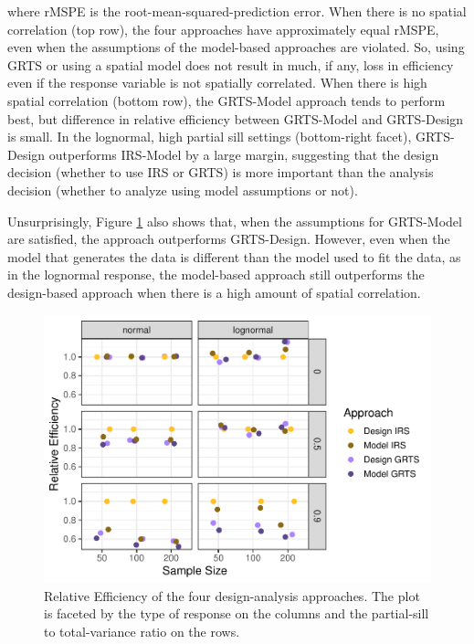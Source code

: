 \documentclass[]{elsarticle} %
\begin{document}
where rMSPE is the root-mean-squared-prediction error. When there is no
spatial correlation (top row), the four approaches have approximately
equal rMSPE, even when the assumptions of the model-based approaches are
violated. So, using GRTS or using a spatial model does not result in
much, if any, loss in efficiency even if the response variable is not
spatially correlated. When there is high spatial correlation (bottom
row), the GRTS-Model approach tends to perform best, but difference in
relative efficiency between GRTS-Model and GRTS-Design is small. In the
lognormal, high partial sill settings (bottom-right facet), GRTS-Design
outperforms IRS-Model by a large margin, suggesting that the design
decision (whether to use IRS or GRTS) is more important than the
analysis decision (whether to analyze using model assumptions or not).

Unsurprisingly, Figure \ref{fig:figeff} also shows that, when the
assumptions for GRTS-Model are satisfied, the approach outperforms
GRTS-Design. However, even when the model that generates the data is
different than the model used to fit the data, as in the lognormal
response, the model-based approach still outperforms the design-based
approach when there is a high amount of spatial correlation.

\begin{figure}
\includegraphics[width=1\linewidth]{manuscript_files/figure-latex/figeff-1} \caption{Relative Efficiency of the four design-analysis approaches. The plot is faceted by the type of response on the columns and the partial-sill to total-variance ratio on the rows.}\label{fig:figeff}
\end{figure}
\end{document}
